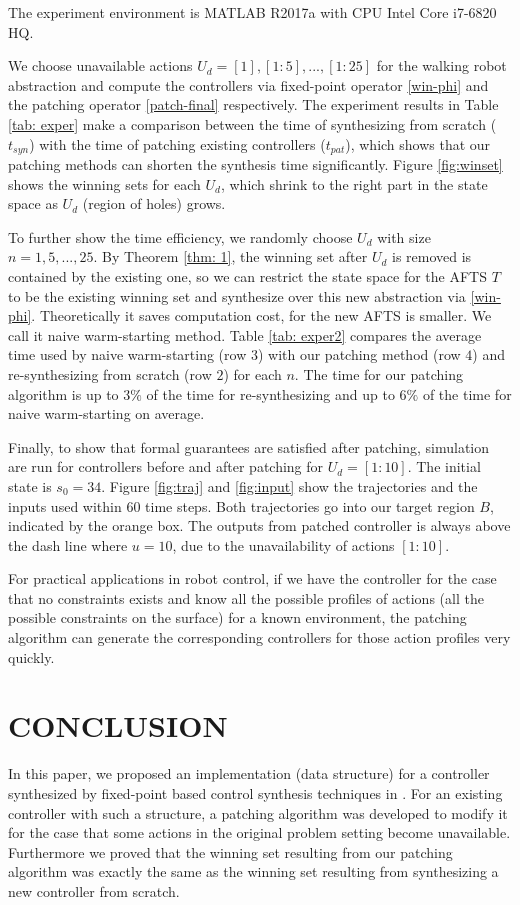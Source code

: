 The experiment environment is MATLAB R2017a with CPU Intel Core  i7-6820 HQ.

We choose unavailable actions $ U_d= [1],[1:5],...,[1:25] $ for the {\color{black} walking} robot abstraction and compute the controllers via fixed-point operator \eqref{win-phi} and the patching operator \eqref{patch-final} respectively.  The experiment results in Table \ref{tab: exper} make a comparison between the time of synthesizing from scratch ($ t_{syn} $) with the time of patching existing controllers ($ t_{pat} $), which shows that our patching methods can shorten the synthesis time significantly. Figure \ref{fig:winset} shows the winning sets for each $ U_d $, which shrink to the right part in the state space as $ U_d $ (region of holes) grows.

To further show the time efficiency, we randomly choose $ U_d $ with size $n = 1,5,...,25 $. {\color{black}By Theorem \ref{thm: 1}, the winning set after $ U_d $ is removed is contained by the existing one, so we can restrict the state space for the AFTS $ T $ to be the existing winning set and synthesize over this new abstraction via \eqref{win-phi}. Theoretically it saves computation cost, for the new AFTS is smaller. We call it naive warm-starting method. Table \ref{tab: exper2} compares the average time used by naive warm-starting (row $ 3 $) with our patching method (row $ 4 $) and re-synthesizing from scratch (row $ 2 $) for each $ n $.} The time for our patching algorithm is up to $ 3\% $ of the time for re-synthesizing and up to $ 6\% $ of the time for naive warm-starting  on average.

Finally, to show that formal guarantees are satisfied after patching, simulation are run for controllers before and after patching for $ U_d =[1:10]$. The initial state is $ s_0=34 $. Figure \ref{fig:traj} and \ref{fig:input} show the trajectories and the inputs used within $ 60 $ time steps. Both trajectories go into our target region $ B $, indicated by the orange box. The outputs from patched controller is always above the dash line where $ u=10 $, due to the unavailability of actions $[1:10] $.

For practical applications in robot control, if we have the controller for the case that no constraints exists and know all the possible profiles of actions (all the possible constraints on the surface) for a known environment, the patching algorithm can generate the corresponding controllers for those action profiles very quickly. 

\section{CONCLUSION}
In this paper, we proposed an implementation (data structure) for a controller synthesized by fixed-point based control synthesis techniques in \cite{Nilsson2017}. For an existing controller with such a structure, a patching algorithm was developed to modify it for the case that some actions in the original problem setting become unavailable. Furthermore we proved that the winning set resulting from our patching algorithm was exactly the same as the winning set resulting from synthesizing a new controller from scratch. 

